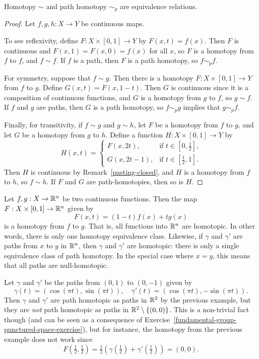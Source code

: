 \begin{lem}
  Homotopy $\sim$ and path homotopy $\sim_p$ are equivalence relations.
\end{lem}
\begin{proof}
  Let $f, g, h : X \to Y$ be continuous maps.
  
  To see reflexivity, define $F : X \times [0,1] \to Y$ by $F(x,t) = f(x)$. Then $F$ is continuous and $F(x,1) = F(x,0) = f(x)$ for all $x$, so $F$ is a homotopy from $f$ to $f$, and $f \sim f$. If $f$ is a path, then $F$ is a path homotopy, so $f \sim_p f$.
  
  For symmetry, suppose that $f \sim g$. Then there is a homotopy $F : X \times [0,1] \to Y$ from $f$ to $g$. Define $G(x,t) = F(x,1-t)$. Then $G$ is continuous since it is a composition of continuous functions, and $G$ is a homotopy from $g$ to $f$, so $g \sim f$. If $f$ and $g$ are paths, then $G$ is a path homotopy, so $f \sim_p g$ implies that $g \sim_p f$.
  
  Finally, for transitivity, if $f \sim g$ and $g \sim h$, let $F$ be a homotopy from $f$ to $g$, and let $G$ be a homotopy from $g$ to $h$. Define a function $H : X \times [0,1] \to Y$ by
  \[
    H(x,t) = \begin{cases} F(x,2t),& \text{if $t \in [0,\tfrac{1}{2}]$,} \\G(x,2t-1), & \text{if $t \in [\tfrac{1}{2},1]$.} \end{cases}
  \]
  Then $H$ is continuous by Remark~\ref{pasting-closed}, and $H$ is a homotopy from $f$ to $h$, so $f \sim h$. If $F$ and $G$ are path-homotopies, then so is $H$.
\end{proof}
\begin{example}
  \label{euclidean-path-homotopy}
  Let $f, g : X \to \mathbb{R}^n$ be two continuous functions. Then the map $F : X \times [0,1] \to \mathbb{R}^n$ given by
  \[
    F(x,t) = (1-t)f(x) + tg(x)
  \]
  is a homotopy from $f$ to $g$. That is, all functions into $\mathbb{R}^n$ are homotopic. In other words, there is only one homotopy equivalence class. Likewise, if $\gamma$ and $\gamma'$ are paths from $x$ to $y$ in $\mathbb{R}^n$, then $\gamma$ and $\gamma'$ are homotopic: there is only a single equivalence class of path homotopy. In the special case where $x = y$, this means that all paths are null-homotopic.
\end{example}
\begin{example}
  Let $\gamma$ and $\gamma'$ be the paths from $(0,1)$ to $(0,-1)$ given by
  \[
    \gamma(t) = (\cos (\pi t), \sin (\pi t)), \quad \gamma'(t) = (\cos(\pi t), -\sin(\pi t)).
  \]
  Then $\gamma$ and $\gamma'$ are path homotopic as paths in $\mathbb{R}^2$ by the previous example, but they are \emph{not} path homotopic as paths in $\mathbb{R}^2 \setminus \{(0,0)\}$. This is a non-trivial fact though (and can be seen as a consequence of Exercise~\ref{fundamental-group-punctured-space-exercise}), but for instance, the homotopy from the previous example does not work since
  \[
    F(\tfrac{1}{2},\tfrac{1}{2}) = \tfrac{1}{2}(\gamma(\tfrac{1}{2}) + \gamma'(\tfrac{1}{2})) = (0,0).
  \]
\end{example}
